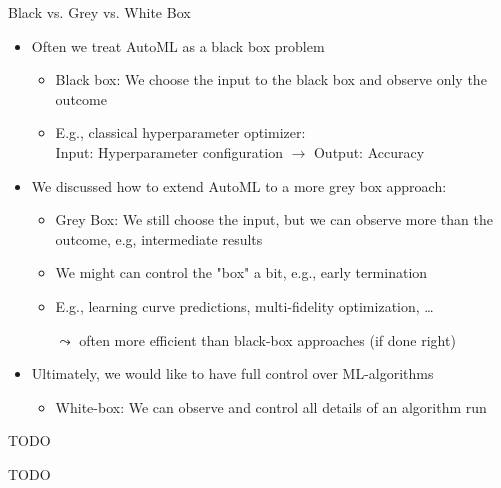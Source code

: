 \begin{frame}[c]{Black vs. Grey vs. White Box}

\begin{itemize}
	\item Often we treat AutoML as a black box problem
	\begin{itemize}
		\item Black box: We choose the input to the black box and observe only the outcome
		\pause
		\item E.g., classical hyperparameter optimizer:\\ Input: Hyperparameter configuration $\to$ Output: Accuracy
	\end{itemize}
   \pause
   \item We discussed how to extend AutoML to a more grey box approach:
   \begin{itemize}
     	\item Grey Box: We still choose the input, but we can observe more than the outcome, e.g, intermediate results
     	\pause
     	\item We might can control the "box" a bit,  e.g., early termination
     	\pause
        \item E.g., learning curve predictions, multi-fidelity optimization, \ldots
        \pause
        \item[$\leadsto$] often more efficient than black-box approaches (if done right)
   \end{itemize}
   \pause
   \item Ultimately, we would like to have full control over ML-algorithms
   \begin{itemize}
     	\item White-box: We can observe and control all details of an algorithm run
     	\pause
   \end{itemize}
\end{itemize}


\end{frame}
\begin{frame}[c]{TODO}

TODO

\end{frame}


